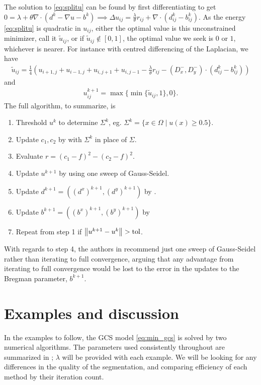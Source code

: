 The solution to \eqref{eq:splitu} can be found by first differentiating to get $0 = \lambda  +\theta  \nabla \cdot ( d^k - \nabla u - b^k) \implies \Delta u_{ij} = \frac{\lambda}{\theta} r_{ij} + \nabla \cdot (d^k_{ij} - b^k_{ij})$. As the energy \eqref{eq:splitu} is quadratic in $u_{ij}$, either the optimal value is this unconstrained minimizer, call it $\widetilde u_{ij}$, or if $\widetilde{u}_{ij} \notin [0,1]$, the optimal value we seek is $0$ or $1$, whichever is nearer. For instance with centred differencing of the Laplacian, we have 
\begin{align}
\widetilde u_{ij} = \frac{1}{4}\left(
u_{i+1,j} + u_{i-1,j} + u_{i,j+1} + u_{i,j-1} 
- \frac{\lambda}{\theta} r_{ij}
-  (D^-_x, D^-_y) \cdot  (d^k_{ij} - b^k_{ij} )
\right) 
\label{eq:sbuij}
\end{align}
and 
\begin{align}
u_{ij}^{k+1}  = \max \{ \min\{ \widetilde u_{ij}, 1 \} , 0 \}.
\label{eq:sbuij2}
\end{align}
The full algorithm, to summarize, is
\begin{enumerate}
	\item Threshold $u^k$ to determine $\Sigma^k$, eg. $\Sigma^k = \{x\in\Omega \mid u(x) \geq 0.5 \}$.
	\item Update $c_1, c_2$ by  with $\Sigma^k$ in place of $\Sigma$.
	
	\item Evaluate $r = (c_1- f)^2 - (c_2 - f)^2$.

	\item Update $u^{k+1}$ by  using one sweep of Gauss-Seidel.
	
	\item Update $d^{k+1} = ((d^x)^{k+1}, (d^y)^{k+1})$ by .
	
	\item Update $b^{k+1} = ((b^x)^{k+1}, (b^y)^{k+1})$ by 
	
	\item Repeat from step 1 if $\left\lVert u^{k+1} - u^k\right\rVert > \textrm{tol}$.
\end{enumerate}
With regards to step 4, the authors in \cite{goldstein2010geometric} recommend just one sweep of Gauss-Seidel rather than iterating to full convergence, arguing that any advantage from iterating to full convergence would be lost to the error in the updates to the Bregman parameter, $b^{k+1}$.


\section{Examples and discussion}
In the examples to follow, the GCS model \eqref{eq:min_gcs} is solved by two numerical algorithms. The parameters used consistently throughout are summarized in ;  $\lambda$ will be provided with each example. We will be looking for any differences in the quality of the segmentation, and comparing efficiency of each method by their iteration count. 


